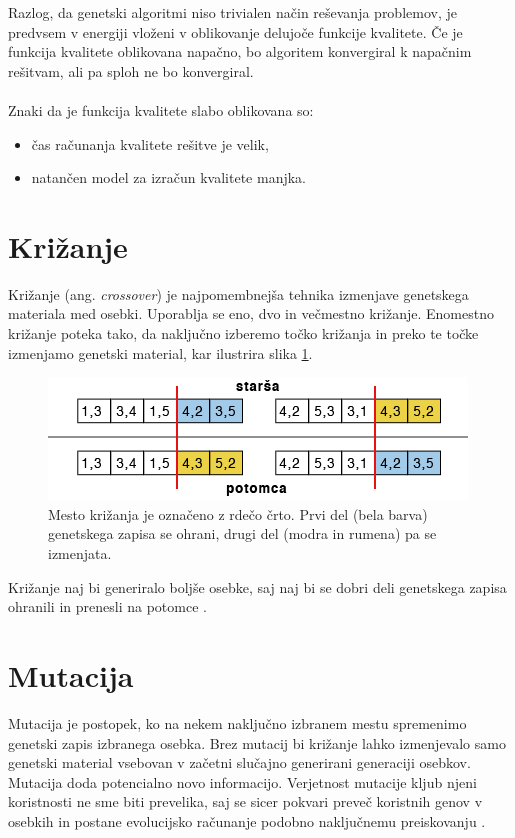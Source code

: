 \documentclass[a4paper, 12pt]{book}
\begin{document}
Razlog, da genetski algoritmi niso trivialen na\v cin re\v sevanja problemov, je predvsem v energiji vlo\v zeni v oblikovanje delujo\v ce funkcije kvalitete. \v Ce je funkcija kvalitete oblikovana napa\v cno, bo algoritem konvergiral k napa\v cnim re\v sitvam, ali pa sploh ne bo konvergiral.\\\\
Znaki da je funkcija kvalitete slabo oblikovana so:
\begin{itemize}
\item \v cas ra\v cunanja kvalitete re\v sitve je velik,
\item natan\v cen model za izra\v cun kvalitete manjka.
\end{itemize}

\section{Kri\v zanje}
\label{seq:krizanje}
Kri\v zanje (ang. \textit{crossover}) je najpomembnej\v sa tehnika izmenjave genetskega materiala med osebki. Uporablja se eno, dvo in ve\v cmestno kri\v zanje. Enomestno kri\v zanje poteka tako, da naklju\v cno izberemo to\v cko kri\v zanja in preko te to\v cke izmenjamo genetski material, kar ilustrira slika \ref{krizanje}.

\begin{figure}
\begin{center}
\includegraphics[scale=0.70]{krizanje.png}
\end{center}
\caption{Mesto kri\v zanja je ozna\v ceno z rde\v co \v crto. Prvi del (bela barva) genetskega zapisa se ohrani, drugi del (modra in rumena) pa se izmenjata.}
\label{krizanje}
\end{figure}

Kri\v zanje naj bi generiralo bolj\v se osebke, saj naj bi se dobri deli genetskega zapisa ohranili in prenesli na potomce \cite{inteligentni sistemi}.

\section{Mutacija}
Mutacija je postopek, ko na nekem naklju\v cno izbranem mestu spremenimo genetski zapis izbranega osebka. 
Brez mutacij bi kri\v zanje lahko izmenjevalo samo genetski material vsebovan v za\v cetni slu\v cajno generirani generaciji osebkov. Mutacija doda potencialno novo informacijo. Verjetnost mutacije kljub njeni koristnosti ne sme biti prevelika, saj se sicer pokvari preve\v c koristnih genov v osebkih in postane evolucijsko ra\v cunanje podobno naklju\v cnemu preiskovanju
\cite{inteligentni sistemi}.
\end{document}

